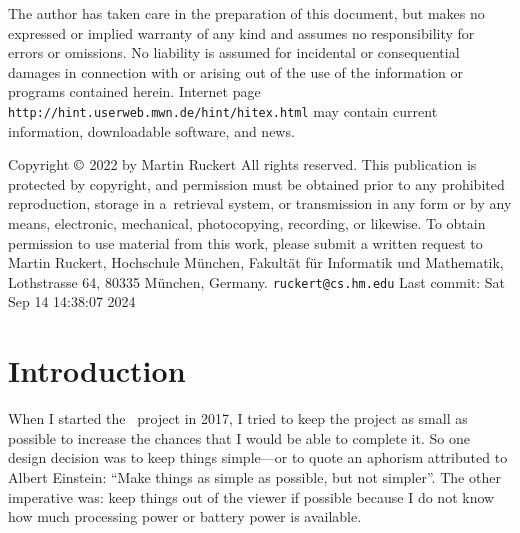 \titletrue
\begingroup
\figrm
\parindent=0pt

{\raggedright\advance\rightskip 3.5pc 
The author has taken care in the preparation of this document,
but makes no expressed or implied warranty of any kind and assumes no
responsibility for errors or omissions. No liability is assumed for
incidental or consequential damages in connection with or arising out
of the use of the information or programs contained herein.
\bigskip
{\def\:{\discretionary{}{}{}}
Internet page  {\tt http:\://hint.\:userweb.\:mwn.\:de/\:hint/hitex.html}
may contain current information, downloadable software,
and news.}

\vfill
Copyright $\copyright$ 2022 by Martin Ruckert
\smallskip
All rights reserved.
\smallskip
This publication is protected by copyright, and permission must be
obtained prior to any prohibited reproduction, storage in
a~retrieval system, or transmission in any form or by any means, electronic,
mechanical, photocopying, recording, or likewise.
To obtain permission to use material from this work, please submit a written
request to Martin Ruckert,
Hochschule M\"unchen,
Fakult\"at f\"ur Informatik und Mathematik,
Lothstrasse 64,
80335 M\"unchen,
Germany.
\medskip
{\tt ruckert\:@cs.hm.edu}
\medskip
Last commit: Sat Sep 14 14:38:07 2024
\par
}
\eject
\endgroup

\frontmatter
{}%

\tableofcontent

\mainmatter

\def\rule#1:#2.{\par{\hangindent32pt\hangafter1\parindent0pt\rightskip 0pt plus 60pt#1{\bf:}\quad%
  \hskip 0pt plus 60pt\penalty-300\hskip 0pt plus -60pt#2{\bf.}\par}}
\def\prim#1.{\par{\hangindent32pt\hangafter1\parindent0pt\rightskip 0pt plus 60pt#1\par}}  
\def\sym#1{$\left<\right.${\it #1\/}$\left.\right>$}
\def\OR{${}\vert{}$}
\def\opt#1{$\left[\right.$#1$\left.\right]$}
\def\ctl#1{{\tt\BS #1}}


\section{Introduction}
When I started the \HINT\ project in 2017,
I tried to keep the project as small as possible to increase the
chances that I would be able to complete it. So one design decision
was to keep things simple---or to quote an aphorism attributed to
Albert Einstein: ``Make things as simple as possible, but not simpler''.
The other imperative was:
keep things out of the viewer if possible because I do not know
how much processing power or battery power is available.


